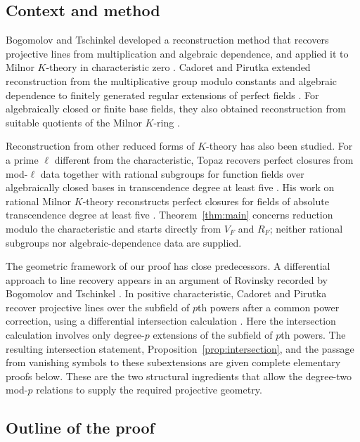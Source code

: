 \subsection{Context and method}

Bogomolov and Tschinkel developed a reconstruction method that recovers
projective lines from multiplication and algebraic dependence, and applied
it to Milnor $K$-theory in characteristic zero
\cite{BogomolovTschinkel2009}. Cadoret and Pirutka extended reconstruction
from the multiplicative group modulo constants and algebraic dependence
to finitely generated regular extensions of perfect fields
\cite[Theorem~4]{CadoretPirutka2021}. For algebraically closed or finite
base fields, they also obtained reconstruction from suitable quotients of
the Milnor $K$-ring \cite[Corollary~10]{CadoretPirutka2021}.

Reconstruction from other reduced forms of $K$-theory has also been studied.
For a prime $\ell$ different from the characteristic, Topaz recovers
perfect closures from mod-$\ell$ data together with rational subgroups
for function fields over algebraically closed bases in transcendence
degree at least five \cite[Theorem~B]{Topaz2016}.
His work on rational Milnor $K$-theory reconstructs perfect closures for
fields of absolute transcendence degree at least five
\cite[Main Theorem]{Topaz2023}. Theorem~\ref{thm:main} concerns reduction
modulo the characteristic and starts directly from $V_F$ and $R_F$;
neither rational subgroups nor algebraic-dependence data are supplied.

The geometric framework of our proof has close predecessors. A differential
approach to line recovery appears in an argument of Rovinsky recorded by
Bogomolov and Tschinkel
\cite[Proposition~9]{BogomolovTschinkel2012}. In positive
characteristic, Cadoret and Pirutka recover projective lines over the
subfield of $p$th powers after a common power correction, using a
differential intersection calculation
\cite[Section~1.3, Lemma~23, and Proposition~27]{CadoretPirutka2021}.
Here the intersection calculation involves only degree-$p$ extensions
of the subfield of $p$th powers.
The resulting intersection statement, Proposition~\ref{prop:intersection},
and the passage from vanishing symbols to these subextensions are given
complete elementary proofs below. These are the two structural ingredients
that allow the degree-two mod-$p$ relations to supply the required
projective geometry.

\subsection{Outline of the proof}

